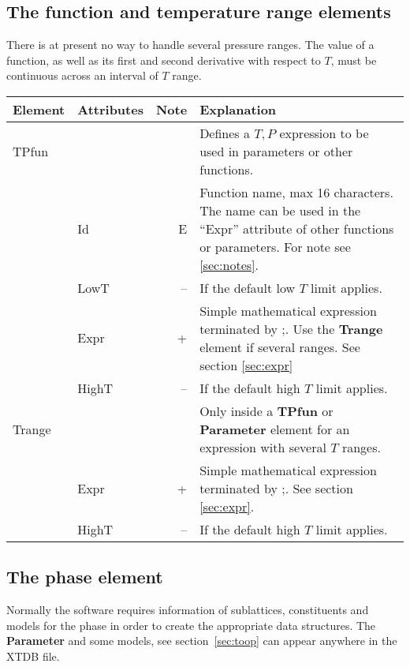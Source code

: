 \documentclass{article}
\begin{document}
\subsection{The function and temperature range elements}

There is at present no way to handle several pressure ranges.  The
value of a function, as well as its first and second derivative with
respect to $T$, must be continuous across an interval of $T$ range.

\bigskip
\begin{tabular}{|p{} p{} r p{}|}\hline
  Element & Attributes & Note & Explanation\\\hline

  TPfun & && Defines a $T, P$ expression to be used in parameters or other functions.\\
        & Id & E & Function name, max 16 characters. The name can be used in the ``Expr'' attribute of other functions or parameters.  For note see \ref{sec:notes}.\\
        & LowT & -- & If the default low $T$ limit applies.\\
        & Expr & + & Simple mathematical expression terminated by ;.   Use the {\bf Trange} element if several ranges.  See section \ref{sec:expr}\\
        & HighT & -- & If the default high $T$ limit applies.\\\hline

  Trange & && Only inside a {\bf TPfun} or {\bf Parameter} element for an expression with several $T$ ranges.\\ 
         & Expr & + & Simple mathematical expression terminated by ;.  See section \ref{sec:expr}.\\
         & HighT & -- & If the default high $T$ limit applies.\\\hline
\end{tabular}


\newpage 

\subsection{The phase element}\label{sec:phase}

Normally the software requires information of sublattices,
constituents and models for the phase in order to create the
appropriate data structures.  The {\bf Parameter} and some models, see
section~\ref{sec:toop} can appear anywhere in the XTDB file.
\end{document}
